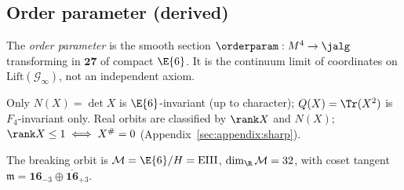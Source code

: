 \subsection{Order parameter (derived)}
\label{sec:foundations:orderparam}

\begin{definition}\label{def:foundations:orderparam}
The \emph{order parameter} is the smooth section $\orderparam:M^4\to\jalg$
transforming in $\mathbf{27}$ of compact $\E{6}$. It is the continuum limit of
coordinates on $\mathrm{Lift}(\mathcal{G}_\infty)$, not an independent axiom.
\end{definition}

\begin{theorem}\label{thm:foundations:orbits}
Only $N(X)=\det X$ is $\E{6}$-invariant (up to character); $Q(X)=\Tr(X^2)$ is
$F_4$-invariant only. Real orbits are classified by $\rank X$ and $N(X)$;
$\rank X\leq1\iff X^{\#}=0$ (Appendix~\ref{sec:appendix:sharp}).
\end{theorem}

\begin{proposition}\label{prop:foundations:eiii}
The breaking orbit is $\mathcal{M}=\E{6}/H=\mathrm{EIII}$,
$\dim_{\R}\mathcal{M}=32$, with coset tangent
$\mathfrak{m}=\mathbf{16}_{-3}\oplus\overline{\mathbf{16}}_{+3}$.
\end{proposition}